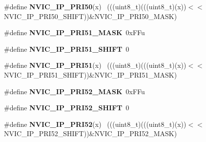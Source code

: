 \begin{DoxyCompactItemize}
\item 
\hypertarget{group___n_v_i_c___register___masks_ga081c9b815ad1fb81f1d88fda0b7717f0}{}\#define {\bfseries N\+V\+I\+C\+\_\+\+I\+P\+\_\+\+P\+R\+I50}(x)                                              ~(((uint8\+\_\+t)(((uint8\+\_\+t)(x))$<$$<$N\+V\+I\+C\+\_\+\+I\+P\+\_\+\+P\+R\+I50\+\_\+\+S\+H\+I\+F\+T))\&N\+V\+I\+C\+\_\+\+I\+P\+\_\+\+P\+R\+I50\+\_\+\+M\+A\+S\+K)\label{group___n_v_i_c___register___masks_ga081c9b815ad1fb81f1d88fda0b7717f0}

\item 
\hypertarget{group___n_v_i_c___register___masks_gacebbcf17aacb8ef864d746e814e0e309}{}\#define {\bfseries N\+V\+I\+C\+\_\+\+I\+P\+\_\+\+P\+R\+I51\+\_\+\+M\+A\+S\+K}~0x\+F\+Fu\label{group___n_v_i_c___register___masks_gacebbcf17aacb8ef864d746e814e0e309}

\item 
\hypertarget{group___n_v_i_c___register___masks_gab1342927c6a75c99bd75d2f0ffe74368}{}\#define {\bfseries N\+V\+I\+C\+\_\+\+I\+P\+\_\+\+P\+R\+I51\+\_\+\+S\+H\+I\+F\+T}~0\label{group___n_v_i_c___register___masks_gab1342927c6a75c99bd75d2f0ffe74368}

\item 
\hypertarget{group___n_v_i_c___register___masks_ga69e40b4e8acc2bf66360442616c5aa5f}{}\#define {\bfseries N\+V\+I\+C\+\_\+\+I\+P\+\_\+\+P\+R\+I51}(x)                                              ~(((uint8\+\_\+t)(((uint8\+\_\+t)(x))$<$$<$N\+V\+I\+C\+\_\+\+I\+P\+\_\+\+P\+R\+I51\+\_\+\+S\+H\+I\+F\+T))\&N\+V\+I\+C\+\_\+\+I\+P\+\_\+\+P\+R\+I51\+\_\+\+M\+A\+S\+K)\label{group___n_v_i_c___register___masks_ga69e40b4e8acc2bf66360442616c5aa5f}

\item 
\hypertarget{group___n_v_i_c___register___masks_gafa8858fc0f5749da7f9570b1118bc871}{}\#define {\bfseries N\+V\+I\+C\+\_\+\+I\+P\+\_\+\+P\+R\+I52\+\_\+\+M\+A\+S\+K}~0x\+F\+Fu\label{group___n_v_i_c___register___masks_gafa8858fc0f5749da7f9570b1118bc871}

\item 
\hypertarget{group___n_v_i_c___register___masks_gafcb3398a8d7461baf9ee7e866833798d}{}\#define {\bfseries N\+V\+I\+C\+\_\+\+I\+P\+\_\+\+P\+R\+I52\+\_\+\+S\+H\+I\+F\+T}~0\label{group___n_v_i_c___register___masks_gafcb3398a8d7461baf9ee7e866833798d}

\item 
\hypertarget{group___n_v_i_c___register___masks_ga65316627894e19c441782ec8dc23de49}{}\#define {\bfseries N\+V\+I\+C\+\_\+\+I\+P\+\_\+\+P\+R\+I52}(x)                                              ~(((uint8\+\_\+t)(((uint8\+\_\+t)(x))$<$$<$N\+V\+I\+C\+\_\+\+I\+P\+\_\+\+P\+R\+I52\+\_\+\+S\+H\+I\+F\+T))\&N\+V\+I\+C\+\_\+\+I\+P\+\_\+\+P\+R\+I52\+\_\+\+M\+A\+S\+K)\label{group___n_v_i_c___register___masks_ga65316627894e19c441782ec8dc23de49}


\end{DoxyCompactItemize}
